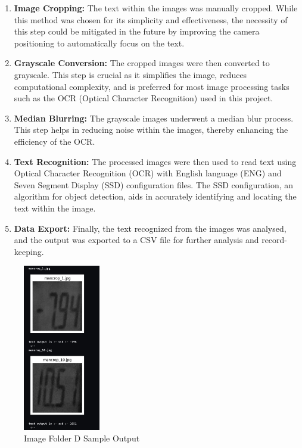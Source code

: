 \begin{enumerate}
    \item \textbf{Image Cropping:} The text within the images was manually cropped. While this method was chosen for its simplicity and effectiveness, the necessity of this step could be mitigated in the future by improving the camera positioning to automatically focus on the text.

    \item \textbf{Grayscale Conversion:} The cropped images were then converted to grayscale. This step is crucial as it simplifies the image, reduces computational complexity, and is preferred for most image processing tasks such as the OCR (Optical Character Recognition) used in this project.

    \item \textbf{Median Blurring:} The grayscale images underwent a median blur process. This step helps in reducing noise within the images, thereby enhancing the efficiency of the OCR.

    \item \textbf{Text Recognition:} The processed images were then used to read text using Optical Character Recognition (OCR) with English language (ENG) and Seven Segment Display (SSD) configuration files. The SSD configuration, an algorithm for object detection, aids in accurately identifying and locating the text within the image.

    \item \textbf{Data Export:} Finally, the text recognized from the images was analysed, and the output was exported to a CSV file for further analysis and record-keeping.
\end{enumerate}

\begin{figure}[ht]
    \centering
    \includegraphics[width=0.3\textwidth]{Figures/Methodology/sipa_05/sample_output.jpg}
    \caption[Image Folder D Sample Output]{Image Folder D Sample Output}
    \label{fig:Image Folder D Sample Output}
\end{figure}


